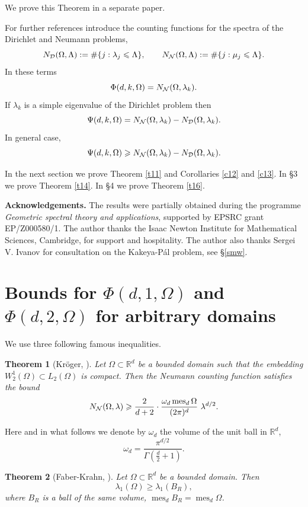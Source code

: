 \documentclass[a4paper,12pt]{article}
\numberwithin{equation}{section}
\def \la{\lambda}
\def \oo{\omega}
\def \G{\Gamma}
\def \L{\Lambda}
\def \O{\Omega}
\def \R{\mathbb{R}}
\def\mes{\operatorname{mes}}
\newcommand{\<}{\langle}
\renewcommand{\>}{\rangle}
\theoremstyle{plain}
\newtheorem{theorem}{\bf Theorem}[section]
\theoremstyle{definition}
\theoremstyle{remark}
\renewcommand{\le}{\leqslant}
\renewcommand{\ge}{\geqslant}
\begin{document}
We prove this Theorem in a separate paper.

For further references introduce the counting functions 
for the spectra of the Dirichlet and Neumann problems,
$$
N_{\cal D} (\O,\L) := \# \{ j: \la_j \le \L\}, \qquad
N_{\cal N} (\O,\L) := \# \{ j: \mu_j \le \L\} .
$$
In these terms
\begin{equation}
\label{14}
\Phi (d, k, \O) = N_{\cal N} (\O, \la_k).
\end{equation}
If $\la_k$ is a simple eigenvalue of the Dirichlet problem then
$$
\Psi (d, k, \O) = N_{\cal N} (\O, \la_k) - N_{\cal D} (\O, \la_k).
$$
In general case,
\begin{equation}
\label{15}
\Psi (d, k, \O) \ge N_{\cal N} (\O, \la_k) - N_{\cal D} (\O, \la_k).
\end{equation}

In the next section we prove Theorem \ref{t11} and Corollaries \ref{c12} and \ref{c13}.
In \S 3 we prove Theorem \ref{t14}.
In \S 4 we prove Theorem \ref{t16}.

{\bf Acknowledgements.} The results were partially obtained during the programme
{\it Geometric spectral theory and applications}, supported by EPSRC grant EP/Z000580/1.
The author thanks the Isaac Newton Institute for Mathematical Sciences, Cambridge, 
for support and hospitality.
The author also thanks Sergei V. Ivanov for consultation on the Kakeya-P\'al problem,
see \S \ref{smw}.

\section{Bounds for $\Phi (d, 1, \O)$ and $\Phi (d, 2, \O)$ for arbitrary domains}

We use three following famous inequalities.

\begin{theorem}[Kr\" oger, \cite{Kr}]
\label{t21}
Let $\O \subset \R^d$ be a bounded domain such that
the embedding $W_2^1 (\O) \subset L_2 (\O)$ is compact.
Then the Neumann counting function satisfies the bound
$$
N_{\cal N} (\O,\la) \ge \frac2{d+2} \cdot \frac{\oo_d \mes_d \O}{(2\pi)^d}\ \la^{d/2}.
$$
\end{theorem}

Here and in what follows we denote by $\oo_d$ 
the volume of the unit ball in $\R^d$,
$$
\oo_d = \frac{\pi^{d/2}}{\G \left(\frac{d}2+1\right)}.
$$

\begin{theorem}[Faber-Krahn, \cite{Faber, Krahn}]
\label{t22}
Let $\O \subset \R^d$ be a bounded domain.
Then 
$$
\la_1 (\O) \ge \la_1 (B_R),
$$
where $B_R$ is a ball of the same volume, $\mes_d B_R = \mes_d \O$.
\end{theorem}
\end{document}
